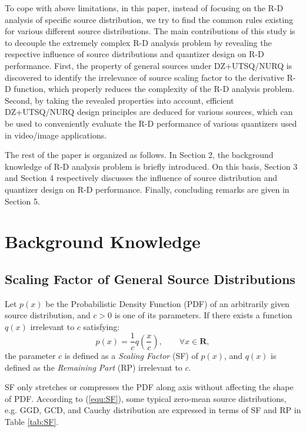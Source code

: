 \documentclass[smallabstract,smallcaptions]{dccpaper}
\begin{document}
To cope with above limitations, in this paper, instead of focusing on the R-D analysis of specific source distribution, we try to find the common rules existing for various different source distributions. The main contributions of this study is to decouple the extremely complex R-D analysis problem by revealing the respective influence of source distributions and quantizer design on R-D performance. First, the property of general sources under DZ+UTSQ/NURQ is discovered to identify the irrelevance of source scaling factor to the derivative R-D function, which properly reduces the complexity of the R-D analysis problem. Second, by taking the revealed properties into account, efficient DZ+UTSQ/NURQ design principles are deduced for various sources, which can be used to conveniently evaluate the R-D performance of various quantizers used in video/image applications. 

The rest of the paper is organized as follows. In Section 2, the background knowledge of R-D analysis problem is briefly introduced. On this basis, Section 3 and Section 4 respectively discusses the influence of source distribution and quantizer design on R-D performance. Finally, concluding remarks are given in Section 5.

\section{Background Knowledge}

\subsection{Scaling Factor of General Source Distributions}
Let $p(x)$ be the Probabilistic Density Function (PDF) of an arbitrarily given source distribution, and $c>0$ is one of its parameters. If there exists a function $q(x)$ irrelevant to $c$ satisfying:
\begin{equation}
\label{equ:SF}
p(x)=\frac{1}{c} q(\frac{x}{c}),\qquad \forall x \in \mathbf{R},
\end{equation}
the parameter $c$ is defined as a \emph{Scaling Factor} (SF) of $p(x)$, and $q(x)$ is defined as the \emph{Remaining Part} (RP) irrelevant to $c$.

SF only stretches or compresses the PDF along axis without affecting the shape of PDF. According to (\ref{equ:SF}), some typical zero-mean source distributions, e.g. GGD, GCD, and Cauchy distribution are expressed in terms of SF and RP in Table \ref{tab:SF}. %
\end{document}
